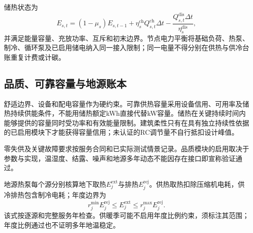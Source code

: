 储热状态为
\begin{equation}
E_{s,t}=(1-\mu_s)E_{s,t-1}+\eta_s^{\mathrm{ch}}Q_{s,t}^{\mathrm{ch}}\Delta t
-\frac{Q_{s,t}^{\mathrm{dis}}\Delta t}{\eta_s^{\mathrm{dis}}},
\label{eq:storage-state}
\end{equation}
并满足能量容量、充放功率、互斥和初末边界。节点电力平衡将基础负荷、热泵、制冷、循环泵及已启用储电纳入同一接入限制；同一电量不得分别在供热与供冷台账重复计费或计碳。

\subsection{品质、可靠容量与地源账本}

舒适边界、设备和配电容量作为硬约束。可靠供热容量采用设备信用、可用率及储热持续供能条件，不能用储热额定kWh直接代替kW容量。储热在关键持续时间内能够提供的容量同时受功率和有效能量限制。建筑柔性只有在具有独立持续性依据的已启用模块下才能获得容量信用；未认证的RC调节量不自行抵扣设计峰值。

零失供及关键故障要求按服务合同和已实际测试情景记录。品质模块的启用取决于参数与实现，温湿度、结露、噪声和地源多年动态不能因存在接口即宣称验证通过。

地源热泵每个源分别核算地下取热$E_j^{\mathrm{ext}}$与排热$E_j^{\mathrm{rej}}$。供热取热扣除压缩机电耗，供冷排热包含制冷电耗；年度边界为
\begin{equation}
r_j^{\min}E_j^{\mathrm{rej}}\leq E_j^{\mathrm{ext}}
\leq r_j^{\max}E_j^{\mathrm{rej}}.
\label{eq:ground-ledger}
\end{equation}
该式按逐源和完整服务年检查。供暖季可能不启用年度比例约束，须标注其范围；年度比例通过也不证明多年地温稳定。
